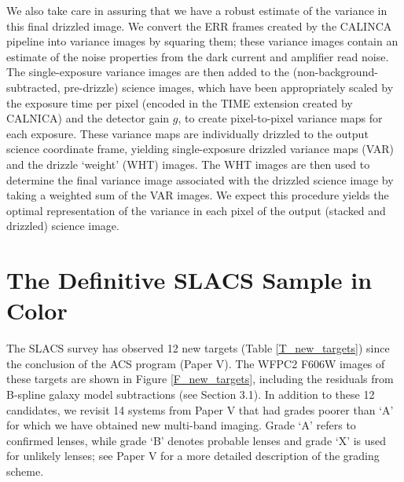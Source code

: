 \documentclass[iop]{emulateapj}
\begin{document}
We also take care in assuring that we have a robust estimate of the variance in this final drizzled image. We convert the \textsf{ERR} frames created by the CALINCA pipeline into variance images by squaring them; these variance images contain an estimate of the noise properties from the dark current and amplifier read noise. The single-exposure variance images are then added to the (non-background-subtracted, pre-drizzle) science images, which have been appropriately scaled by the exposure time per pixel (encoded in the \textsf{TIME} extension created by CALNICA) and the detector gain $g$, to create pixel-to-pixel variance maps for each exposure.
These variance maps are individually drizzled to the output science coordinate frame, yielding single-exposure drizzled variance maps (\textsf{VAR}) and the drizzle `weight' (\textsf{WHT}) images. The \textsf{WHT} images are then used to determine the final variance image associated with the drizzled science image by taking a weighted sum of the \textsf{VAR} images.
We expect this procedure yields the optimal representation of the variance in each pixel of the output (stacked and drizzled) science image.


\section{The Definitive SLACS Sample in Color}
The SLACS survey has observed 12 new targets (Table \ref{T_new_targets}) since the conclusion of the ACS program (Paper V). The WFPC2 F606W images of these targets are shown in Figure \ref{F_new_targets}, including the residuals from B-spline galaxy model subtractions (see Section 3.1). In addition to these 12 candidates, we revisit 14 systems from Paper V that had grades poorer than `A' for which we have obtained new multi-band imaging. Grade `A' refers to confirmed lenses, while grade `B' denotes probable lenses and grade `X' is used for unlikely lenses; see Paper V for a more detailed description of the grading scheme.
\end{document}
